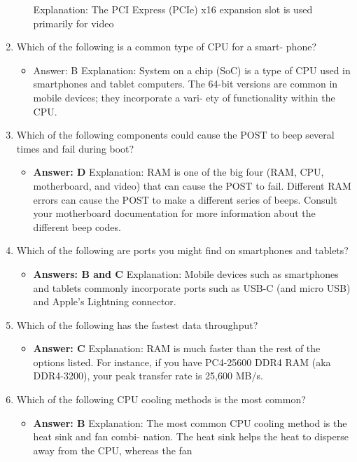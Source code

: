 \documentclass{article}
\begin{document}
\begin{enumerate}
\begin{itemize}
Explanation: The PCI Express (PCIe) x16 expansion slot is used primarily for video
    \end{itemize}
     \item Which of the following is a common type of CPU for a smart-
phone?
    \begin{itemize}
        \item Answer: B
Explanation: System on a chip (SoC) is a type of CPU used in smartphones and tablet
computers. The 64-bit versions are common in mobile devices; they incorporate a vari-
ety of functionality within the CPU.
    \end{itemize}
     \item Which of the following components could cause the POST to beep
several times and fail during boot?
    \begin{itemize}
        \item \textbf{Answer: D}
Explanation: RAM is one of the big four (RAM, CPU, motherboard, and video) that can
cause the POST to fail. Different RAM errors can cause the POST to make a different
series of beeps. Consult your motherboard documentation for more information about
the different beep codes.
    \end{itemize}
     \item Which of the following are ports you might find on smartphones and tablets? 
    \begin{itemize}
        \item \textbf{Answers: B and C}
Explanation: Mobile devices such as smartphones and tablets commonly incorporate
ports such as USB-C (and micro USB) and Apple’s Lightning connector.
    \end{itemize}
    \item Which of the following has the fastest data throughput? 
    \begin{itemize}
        \item \textbf{Answer: C}
Explanation: RAM is much faster than the rest of the options listed. For instance, if
you have PC4-25600 DDR4 RAM (aka DDR4-3200), your peak transfer rate is 25,600
MB/s.
    \end{itemize}
    \item Which of the following CPU cooling methods is the most common? 
    \begin{itemize}
        \item \textbf{ Answer: B}
Explanation: The most common CPU cooling method is the heat sink and fan combi-
nation. The heat sink helps the heat to disperse away from the CPU, whereas the fan

\end{itemize}
\end{enumerate}
\end{document}
